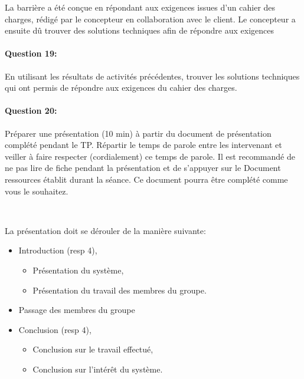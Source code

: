 La barrière a été conçue en répondant aux exigences issues d'un cahier des charges, rédigé par le concepteur en collaboration avec le client. Le concepteur a ensuite dû trouver des solutions techniques afin de répondre aux exigences 

\paragraph{Question 19:} En utilisant les résultats de activités précédentes, trouver les solutions techniques qui ont permis de répondre aux exigences du cahier des charges.


\paragraph{Question 20:} Préparer une présentation (10 min) à partir du document de présentation complété pendant le TP. Répartir le temps de parole entre les intervenant et veiller à faire respecter (cordialement) ce temps de parole. Il est recommandé de ne pas lire de fiche pendant la présentation et de s'appuyer sur le \og Document ressources \fg établit durant la séance. Ce document pourra être complété comme vous le souhaitez.

~\

La présentation doit se dérouler de la manière suivante:
\begin{itemize}
 \item Introduction (resp 4),
 \begin{itemize}
 \item Présentation du système,
 \item Présentation du travail des membres du groupe.
 \end{itemize}
 \item Passage des membres du groupe
 \item Conclusion (resp 4),
 \begin{itemize}
 \item Conclusion sur le travail effectué,
 \item Conclusion sur l'intérêt du système.
 \end{itemize}
\end{itemize}


